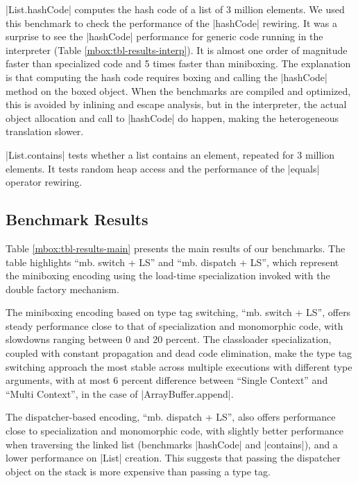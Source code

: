 |List.hashCode| computes the hash code of a list of 3 million elements. We used this benchmark to check the performance of the |hashCode| rewiring. It was a surprise to see the |hashCode| performance for generic code running in the interpreter (Table \ref{mbox:tbl-results-interp}). It is almost one order of magnitude faster than specialized code and 5 times faster than miniboxing. The explanation is that computing the hash code requires boxing and calling the |hashCode| method on the boxed object. When the benchmarks are compiled and optimized, this is avoided by inlining and escape analysis, but in the interpreter, the actual object allocation and call to |hashCode| do happen, making the heterogeneous translation slower.
 
|List.contains| tests whether a list contains an element, repeated for 3 million elements. It tests random heap access and the performance of the |equals| operator rewiring.

\subsection{Benchmark Results}
\label{mbox:subsec-eval-results}

Table \ref{mbox:tbl-results-main} presents the main results of our benchmarks. The table highlights  ``mb. switch + LS'' and ``mb. dispatch + LS'', which represent the miniboxing encoding using the load-time specialization invoked with the double factory mechanism.

The miniboxing encoding based on type tag switching, ``mb. switch + LS'', offers steady performance close to that of specialization and monomorphic code, with slowdowns ranging between 0 and 20 percent. The classloader specialization, coupled with constant propagation and dead code elimination, make the type tag switching approach the most stable across multiple executions with different type arguments, with at most 6 percent difference between ``Single Context'' and ``Multi Context'', in the case of |ArrayBuffer.append|.    

The dispatcher-based encoding, ``mb. dispatch + LS'', also offers performance close to specialization and mono\-morphic code, with slightly better performance when traversing the linked list (benchmarks |hashCode| and |contains|), and a lower performance on |List| creation. This suggests that passing the dispatcher object on the stack is more expensive than passing a type tag. 

